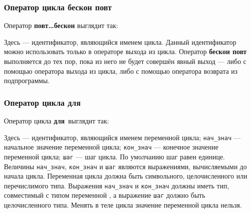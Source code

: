 \documentclass[10pt]{report}
\begin{document}
        \subsubsection{Оператор цикла \glqq бескон повт\grqq}
Оператор \textbf{\glqq повт\dots бескон\grqq} выглядит так:
\begin{center}
\textcolor{Green}{}
\end{center}
Здесь \textcolor{Green}{} --- идентификатор, являющийся именем цикла. Данный идентификатор можно использовать только в операторе выхода из цикла.
Оператор \textbf{\glqq бескон повт\grqq} выполняется до тех пор, пока из него не будет совершён явный выход --- либо с помощью оператора выхода из цикла, либо с
помощью оператора возврата из подпрограммы.
    
    

        \subsubsection{Оператор цикла \glqq для\grqq}
Оператор цикла \textbf{\glqq для\grqq}\ выглядит так:
\begin{center}
\textcolor{Green}{}
\end{center}

Здесь \textcolor{Green}{} --- идентификатор, являющийся именем переменной цикла; \texttt{нач_знач} --- начальное значение переменной цикла;
\texttt{кон_знач} --- конечное значение переменной цикла; \texttt{шаг} --- шаг цикла. По умолчанию шаг равен единице. Величины \texttt{нач_знач}, \texttt{кон_знач} и
\texttt{шаг} являются выражениями, вычисляемыми до начала цикла. Переменная цикла должна быть символьного, целочисленного или перечислимого типа. Выражения \texttt{нач_знач} и
\texttt{кон_знач} должны иметь тип, совместимый с типом переменной \textcolor{Green}{}, а выражение \texttt{шаг} должно быть целочисленного типа.
Менять в теле цикла значение переменной цикла нельзя.
\end{document}
